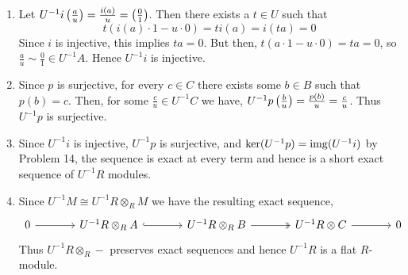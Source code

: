 \documentclass[Notebook.tex]{subfiles}
\begin{document}
\begin{solution}
    \bbni
    \begin{enumerate}
        \item Let $U^{-1}i \left(\frac{a}{u}\right) = \frac{i(a)}{u} = \left(\frac{0}{1}\right)$. Then there exists a $t \in U$ such that
        \[t(i(a) \cdot 1 - u \cdot 0) = ti(a) = i(ta) = 0\]
        Since $i$ is injective, this implies $ta = 0$. But then, $t(a \cdot 1 - u \cdot 0) = ta = 0$, so $\frac{a}{u} \sim \frac{0}{1} \in U^{-1}A$. Hence $U^{-1}i$ is injective. 
        
        \item Since $p$ is surjective, for every $c \in C$ there exists some $b \in B$ such that $p(b) = c$. Then, for some $\frac{c}{u} \in U^{-1}C$ we have, $U^{-1}p \left(\frac{b}{u}\right) = \frac{p(b)}{u} = \frac{c}{u}$. Thus $U^{-1}p$ is surjective.  
        
        \item Since $U^{-1}i$ is injective, $U^{-1}p$ is surjective, and $\ker(U^{-1}p) = \operatorname{img}(U^{-1}i)$ by Problem 14, the sequence is exact at every term and hence is a short exact sequence of $U^{-1}R$ modules. 
        
        \item Since $U^{-1}M\cong U^{-1}R\otimes_R M$ we have the resulting exact sequence, 
         \[
        \begin{tikzcd}[column sep=large]
        0 \arrow[r] & U^{-1}R \otimes_R A \arrow[r, hook] & U^{-1}R \otimes_R B \arrow[r, two heads] & U^{-1}R \otimes C \arrow[r] & 0
        \end{tikzcd}
        \]
        Thus $U^{-1}R \otimes_R -$ preserves exact sequences and hence $U^{-1}R$ is a flat $R$-module.
    \end{enumerate}
\end{solution}

\newpage 
\end{document}
